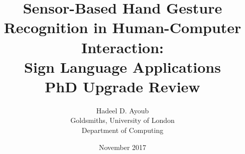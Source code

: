 \documentclass[a4paper,11pt]{report}
\begin{document}
\author{Hadeel D. Ayoub \vspace{.4cm} \\ \small Goldsmiths, University of London \\ \small Department of Computing}
\title{
    Sensor-Based Hand Gesture Recognition in Human-Computer Interaction: \\ Sign Language Applications \\ \vspace{.5cm} \large PhD Upgrade Review}
\date{November 2017}

\maketitle

\tableofcontents



\nocite{*}

\printbibliography[heading=bibintoc]
\end{document}
